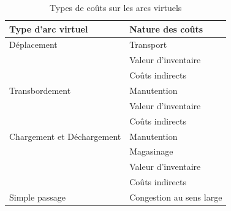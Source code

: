 \begin{table}[htbp]
\begin{center}
\begin{tabular}{ll}
\hline

Type d'arc virtuel  &Nature des coûts\\
\hline
Déplacement         & Transport\\
                    & Valeur d'inventaire\\
                    & Coûts indirects\\

Transbordement      & Manutention\\
                    & Valeur d'inventaire\\
                    & Coûts indirects\\

Chargement et Déchargement & Manutention\\
                           & Magasinage\\
                           & Valeur d'inventaire\\
                           & Coûts indirects\\

Simple passage             & Congestion au sens large\\
\hline
\end{tabular}
\caption{\label{tab4_2} Types de co\^uts sur les arcs virtuels}
\end{center}
\end{table}












